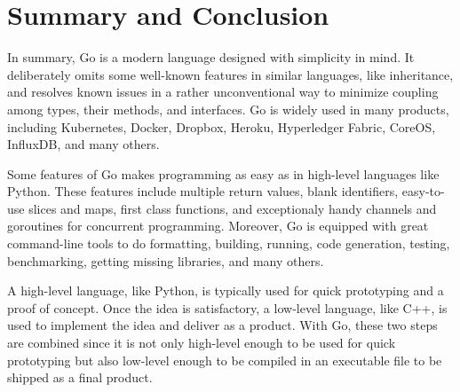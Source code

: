 \documentclass[11pt]{article}
\begin{document}
\section*{Summary and Conclusion}
\label{sec:orgheadline22}
In summary, Go is a modern language designed with simplicity in mind. It deliberately omits some well-known features in similar languages, like inheritance, and resolves known issues in a rather unconventional way to minimize coupling among types, their methods, and interfaces. Go is widely used in many products, including Kubernetes, Docker, Dropbox, Heroku, Hyperledger Fabric, CoreOS, InfluxDB, and many others.

Some features of Go makes programming as easy as in high-level languages like Python. These features include multiple return values, blank identifiers, easy-to-use slices and maps, first class functions, and exceptionaly handy channels and goroutines for concurrent programming. Moreover, Go is equipped with great command-line tools to do formatting, building, running, code generation, testing, benchmarking, getting missing libraries, and many others.

A high-level language, like Python, is typically used for quick prototyping and a proof of concept. Once the idea is satisfactory, a low-level language, like C++, is used to implement the idea and deliver as a product. With Go, these two steps are combined since it is not only high-level enough to be used for quick prototyping but also low-level enough to be compiled in an executable file to be shipped as a final product.
\end{document}
